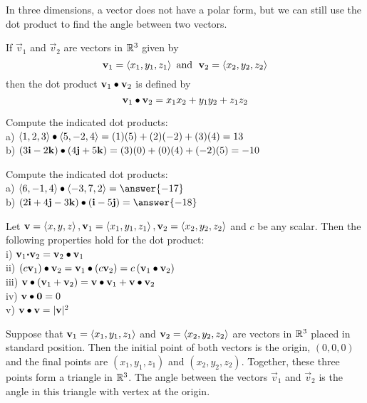 \documentclass[handout]{ximera}
\begin{document}
In three dimensions, a vector does not have a polar form, but we can still use the dot product to find the angle between two vectors.
\begin{definition}
If $\vec{v}_1$ and $\vec{v}_2$ are vectors in $\mathbb R^3$ given by
\[
\mathbf{v}_1 = \left\langle x_1, y_1, z_1\right\rangle \text{  and   } \;\mathbf{v}_2 = \left\langle x_2, y_2, z_2\right\rangle
\]
then the dot product $\mathbf{v}_1 \bullet \mathbf{v}_2$ is defined by
\[
\mathbf{v}_1 \bullet \mathbf{v}_2 = x_1x_2 + y_1y_2 + z_1z_2
\]
\end{definition}

\begin{example}
Compute the indicated dot products:\\
a) $\left\langle 1, 2, 3\right\rangle \bullet \left\langle 5, -2, 4\right\rangle = (1)(5)+ (2)(-2) + (3)(4) = 13$\\
b) $\left(3\mathbf{i} - 2\mathbf{k}\right) \bullet \left(4\mathbf{j} + 5\mathbf{k}\right) = (3)(0) + (0)(4) + (-2)(5) = -10$
\end{example}

\begin{problem}
Compute the indicated dot products:\\
a) $\vector{6, -1, 4} \dotp \vector{-3, 7, 2} = \answer{-17}$\\
b) $\left(2\vec{i} + 4\vec{j} - 3\vec{k}\right) \dotp \left(\vec{i} -5\vec{j}\right) = \answer{-18}$
\end{problem}

\begin{proposition}
Let $\mathbf{v} = \left\langle x, y, z\right\rangle, \mathbf{v}_1 = \left\langle x_1, y_1, z_1\right\rangle, \mathbf{v}_2 = \left\langle x_2, y_2, z_2\right\rangle$ and $c$ be any scalar. 
Then the following properties hold for the dot product:\\
i) $\mathbf{v}_1 {\boldsymbol \cdot} \mathbf{v}_2 =\mathbf{v}_2 \bullet \mathbf{v}_1$\\
ii) $\left(c\mathbf{v}_1\right) \bullet \mathbf{v}_2 =\mathbf{v}_1 \bullet \left(c\mathbf{v}_2\right) = c\left(\mathbf{v}_1 \bullet \mathbf{v}_2\right)$\\
iii)  $\mathbf{v} \bullet \left(\mathbf{v}_1 +\mathbf{v}_2\right) =\mathbf{v} \bullet\mathbf{v}_1 +\mathbf{v}\bullet \mathbf{v}_2$\\
iv) $\mathbf{v} \bullet \mathbf{0} = 0$\\
v) $\mathbf{v} \bullet \mathbf{v} = |\mathbf{v}|^2$
\end{proposition}

Suppose that $\mathbf{v}_1=\left\langle x_1, y_1, z_1\right\rangle$ and $\mathbf{v}_2=\left\langle x_2, y_2, z_2\right\rangle$  are vectors in $\mathbb R^3$ placed in standard position.  
Then the initial point of both vectors is the origin, $(0,0,0)$ and the final points are
$(x_1, y_1, z_1)$ and $(x_2, y_2, z_2)$.  Together, these three points form a triangle in $\mathbb R^3$.  
The angle between the vectors $\vec{v}_1$ and $\vec{v}_2$ is the angle in this triangle with vertex at the origin.
\end{document}
